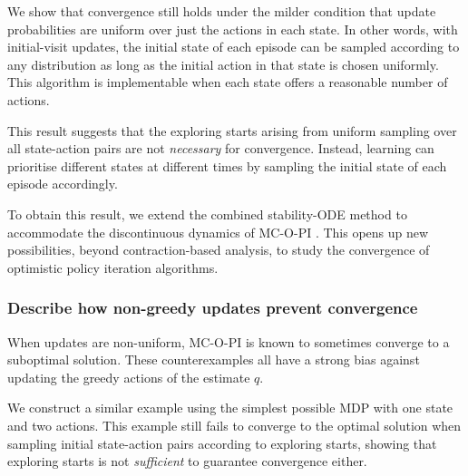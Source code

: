 We show that convergence still holds under the milder condition that update probabilities are uniform over just the actions in each state.
In other words, with initial-visit updates, the initial state of each episode can be sampled according to any distribution as long as the initial action in that state is chosen uniformly.
This algorithm is implementable when each state offers a reasonable number of actions.

This result suggests that the exploring starts arising from uniform sampling over all state-action pairs are not \textit{necessary} for convergence.
Instead, learning can prioritise different states at different times by sampling the initial state of each episode accordingly.


To obtain this result, we extend the combined stability-ODE method to accommodate the discontinuous dynamics of MC-O-PI \citep[Section~5.4]{Kushner2003StochasticApplications}.
This opens up new possibilities, beyond contraction-based analysis, to study the convergence of optimistic policy iteration algorithms.







\subsubsection{Describe how non-greedy updates prevent convergence}

When updates are non-uniform, MC-O-PI is known to sometimes converge to a suboptimal solution.
These counterexamples all have a strong bias against updating the greedy actions of the estimate $q$.


We construct a similar example using the simplest possible MDP with one state and two actions.
This example still fails to converge to the optimal solution when sampling initial state-action pairs according to exploring starts, showing that exploring starts is not \textit{sufficient} to guarantee convergence either.

